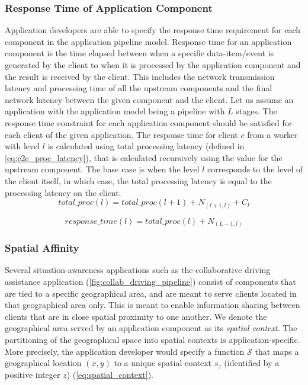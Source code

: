 \subsubsection{Response Time of Application Component}
Application developers are able to specify the response time requirement for each component in the application pipeline model. Response time for an application component is the time elapsed between when a specific data-item/event is generated by the client to when it is processed by the application component and the result is received by the client. This includes the network transmission latency and processing time of all the upstream components and the final network latency between the given component and the client. Let us assume an application with the application model being a pipeline with $L$ stages. The response time constraint for each application component should be satisfied for each client of the given application. The response time for client $c$ from a worker with level $l$ is calculated using total processing latency (defined in \cref{eq:e2e_proc_latency}), that is calculated recursively using the value for the upstream component. The base case is when the level $l$ corresponds to the level of the client itself, in which case, the total processing latency is equal to the processing latency on the client.
\begin{equation}
\label{eq:e2e_proc_latency}
total\_proc \left( l \right) = total\_proc \left(l+1 \right) + N_{\left( l+1, l\right)} + C_{l}
\end{equation}

\begin{equation}
\label{eq:response_time}
response\_time \left( l \right) = total\_proc \left(l \right) + N_{\left( L-1, l\right)} 
\end{equation}

\subsubsection{Spatial Affinity}
Several situation-awareness applications such as the collaborative driving assistance application (\cref{fig:collab_driving_pipeline}) consist of components that are tied to a specific geographical area, and are meant to serve clients located in that geographical area only. This is meant to enable information sharing between clients that are in close spatial proximity to one another. We denote the geographical area served by an application component as its \textit{spatial context}. The partitioning of the geographical space into spatial contexts is application-specific. More precisely, the application developer would specify a function $\mathcal{S}$ that maps a geographical location $\left( x , y \right)$ to a unique spatial context $s_z$ (identified by a positive integer $z$) (\cref{eq:spatial_context}).

